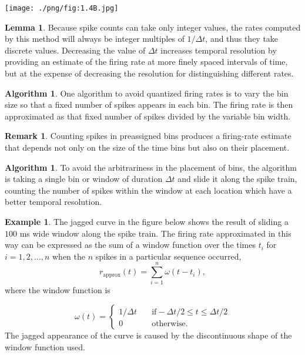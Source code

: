 \documentclass[letterpaper,oneside]{book}
\numberwithin{equation}{chapter}
\theoremstyle{definition}
\newtheorem{alg}[thm]{Algorithm}
\newtheorem{exm}[thm]{Example}
\newtheorem{lem}[thm]{Lemma}
\newtheorem{rem}{Remark}[chapter]
\begin{document}
\begin{multicols}{2}
\begin{center}
  \label{fig:1.4B}
  \texttt{[image: ./png/fig:1.4B.jpg]}
\end{center}

\begin{lem}
   Because spike counts can take only integer values, the rates computed by this method will 
   always 
  be integer multiples of $1 / \Delta t$, and thus they take discrete values. Decreasing 
  the value of $\Delta t$
increases temporal resolution by providing an estimate of the firing rate at
more finely spaced intervals of time, but at the expense of decreasing the
resolution for distinguishing different rates.
\end{lem}

\begin{alg}
  One algorithm to avoid quantized
firing rates is to vary the bin size so that a fixed number of spikes appears
in each bin. The firing rate is then approximated as that fixed number of
spikes divided by the variable bin width.
\end{alg}

\begin{rem}
  Counting spikes in preassigned bins produces a firing-rate estimate that
depends not only on the size of the time bins but also on their placement.
\end{rem}

\begin{alg}
To avoid the arbitrariness in the placement of bins, the algorithm is taking
a single bin or window of duration $\Delta t$ and slide it along the spike train,
counting the number of spikes within the window at each location which have a better 
temporal resolution.
\end{alg}

\begin{exm}
  \label{fig:1.4C}
  The jagged curve in  the figure below shows the result of sliding a $100$ ms wide
window along the spike train.  The firing rate approximated in 
this way
can be expressed as the sum of a window function over the times $t_i$ for
$i = 1 , 2 ,\dots, n$ when the $n$ spikes in a particular sequence occurred,
\begin{equation}
  \label{equ:1.8}
  r_{\text{approx}}(t)=\sum_{i = 1}^{n}\omega(t-t_i), 
\end{equation}
where the window function is

\begin{equation}
  \label{equ:1.9}
  \omega(t)=\left\{
    \begin{aligned}
      1/\Delta t \quad &\text{if} -\Delta t/2\leq t\leq \Delta t/2\\
      0 \quad & \text{otherwise}.
    \end{aligned}
  \right.
\end{equation}
The jagged appearance of the curve is caused 
by the discontinuous shape of the window function used.
\end{exm}


\end{multicols}
\end{document}
